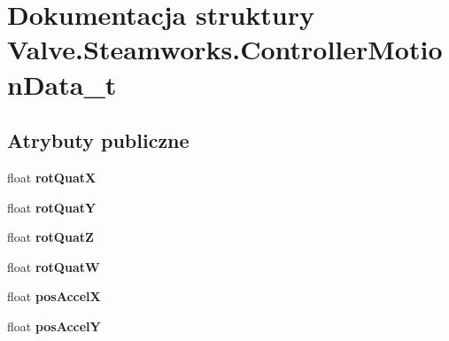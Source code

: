\hypertarget{struct_valve_1_1_steamworks_1_1_controller_motion_data__t}{}\section{Dokumentacja struktury Valve.\+Steamworks.\+Controller\+Motion\+Data\+\_\+t}
\label{struct_valve_1_1_steamworks_1_1_controller_motion_data__t}
\subsection*{Atrybuty publiczne}
\begin{DoxyCompactItemize}
\item 
\mbox{\label{struct_valve_1_1_steamworks_1_1_controller_motion_data__t_a8c75c7e37f1c4e3169b07e842de6fd51}} 
float {\bfseries rot\+QuatX}
\item 
\mbox{\label{struct_valve_1_1_steamworks_1_1_controller_motion_data__t_ab0839d642f84d45e6309cb53a9fc6abb}} 
float {\bfseries rot\+QuatY}
\item 
\mbox{\label{struct_valve_1_1_steamworks_1_1_controller_motion_data__t_ac2a01b27638252f04b451be9844456f6}} 
float {\bfseries rot\+QuatZ}
\item 
\mbox{\label{struct_valve_1_1_steamworks_1_1_controller_motion_data__t_aa882414d48acfb1f079947a7c00a4bb9}} 
float {\bfseries rot\+QuatW}
\item 
\mbox{\label{struct_valve_1_1_steamworks_1_1_controller_motion_data__t_aca8ecd3ddd27d82b8a8188b4492dc97c}} 
float {\bfseries pos\+AccelX}
\item 
\mbox{\label{struct_valve_1_1_steamworks_1_1_controller_motion_data__t_ac5faf7224ea7732217370933b8380313}} 
float {\bfseries pos\+AccelY}
\item 
\mbox{\label{struct_valve_1_1_steamworks_1_1_controller_motion_data__t_a0a86f648f4b025cc284db31e60bc7829}} 

\end{DoxyCompactItemize}
